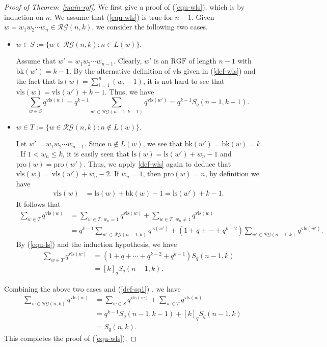 \documentclass[12pt]{amsart}
\numberwithin{equation}{section}
\theoremstyle{plain}
\theoremstyle{definition}
\def\bk{\mathrm{bk}}
\def\RGF{\mathrm{RGF}}
\def\ls{\mathrm{ls}}
\def\wls{\mathrm{vls}}
\def\pl{\mathrm{pro}}
\def\RG{\mathcal{RG}}
\begin{document}
\begin{proof}[Proof of Theorem~\ref{main-rgf}]
We first give a proof of (\ref{equ-wls}), which is by induction on $n$. We assume that (\ref{equ-wls}) is true for $n-1$.
Given $w=w_1 w_2 \cdots w_n \in \RG(n,k) $, we consider the following two cases.
\begin{itemize}
  \item $w \in S:=\{w\in \RG(n,k):n \in L(w)\}$.

  Assume that  $w'=w_1 w_2 \cdots w_{n-1}$. Clearly, $w'$ is an $\RGF$ of length $n-1$ with $\bk(w')=k-1$.
  By the alternative definition of $\wls$ given in
  (\ref{def-wls}) and the fact that $\ls(w)=\sum_{i=1}^n(w_i-1)$, it is not hard to see that
  $\wls(w)=\wls(w')+k-1$.
  Thus, we have
  \begin{equation*}
    \sum_{w \in S}q^{\wls(w)}=q^{k-1}\sum_{w' \in \RG(n-1,k-1) } q^{\wls(w')}=q^{k-1} S_q(n-1,k-1).
  \end{equation*}

  \item $w \in T:=\{w\in \RG(n,k):n \notin L(w)\}$.

 Let $w'=w_1 w_2 \cdots w_{n-1}$. Since $n \notin L(w)$,
 we see that $\bk(w')=\bk(w)=k$. If $1< w_n \leq k$, it is easily seen that $\ls(w)=\ls(w')+w_n-1$ and
 $\pl(w)=\pl(w')$. Thus, we apply \eqref{def-wls} again to deduce that
 $\wls(w)=\wls(w')+w_n-2$. If $w_n=1$, then $\pl(w)=n$, by definition we have
 \begin{align*}
   \wls(w) &=\ls(w)+\bk(w)-1=\ls(w')+k-1.
 \end{align*}
 It follows that
 \begin{align*}
   \sum_{w \in T}q^{\wls(w)} & = \sum_{w \in T,\, w_n=1}q^{\wls(w)}+\sum_{w \in T,\, w_n \neq 1}q^{\wls(w)}\\[6pt]
   & =q^{k-1} \sum_{w' \in \RG(n-1,k)}q^{\ls(w')}+(1+q+\cdots+q^{k-2})\sum_{w' \in \RG(n-1,k)}q^{\wls(w')}.
 \end{align*}
 By (\ref{equ-ls}) and the induction hypothesis, we have
 \begin{align*}
   \sum_{w \in T}q^{\wls(w)}&=(1+q+\cdots+q^{k-2}+q^{k-1})S_q(n-1,k)\\[3pt]
   &=[k]_qS_q(n-1,k).
 \end{align*}
\end{itemize}
Combining the above two cases and (\ref{def-sq1}) , we have
\begin{align*}
 \sum_{w \in \RG(n,k)}q^{\wls(w)} &=\sum_{w \in S}q^{\wls(w)} +\sum_{w \in T}q^{\wls(w)} \\[5pt]
   & =q^{k-1}S_q(n-1,k-1)+[k]_q S_q(n-1,k)\\[5pt]
   &=S_q(n,k).
  \end{align*}
This completes the proof of (\ref{equ-wls}).


\end{proof}
\end{document}
